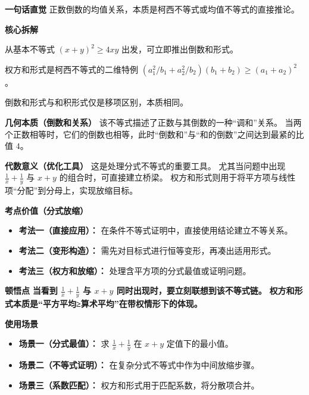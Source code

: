\begin{explanationbox}
\textbf{\textcolor{CExplanation}{一句话直觉}}
正数倒数的均值关系，本质是柯西不等式或均值不等式的直接推论。

\medskip
\textbf{\textcolor{CExplanation}{核心拆解}}
\begin{description}[style=nextline, leftmargin=2.8em, labelsep=0.5em, itemsep=0.45em]
    \item[\textbf{要点一（均值变形）：}] 从基本不等式 $(x+y)^2 \ge 4xy$ 出发，可立即推出倒数和形式。
    \item[\textbf{要点二（柯西特例）：}] 权方和形式是柯西不等式的二维特例 $(a_1^2/b_1 + a_2^2/b_2)(b_1+b_2) \ge (a_1+a_2)^2$。
    \item[\textbf{要点三（形式等价）：}] 倒数和形式与和积形式仅是移项区别，本质相同。
\end{description}

\medskip
\textbf{\textcolor{CExplanation}{几何本质（倒数和关系）}}
该不等式描述了正数与其倒数的一种“调和”关系。
当两个正数相等时，它们的倒数也相等，此时“倒数和”与“和的倒数”之间达到最紧的比值 $4$。

\medskip
\textbf{\textcolor{CExplanation}{代数意义（优化工具）}}
这是处理分式不等式的重要工具。
尤其当问题中出现 $\frac{1}{x}+\frac{1}{y}$ 与 $x+y$ 的组合时，可直接建立桥梁。
权方和形式则用于将平方项与线性项“分配”到分母上，实现放缩目标。

\medskip
\textbf{\textcolor{CExplanation}{考点价值（分式放缩）}}
\begin{itemize}[leftmargin=*, itemsep=0.5em, topsep=0.4em]
    \item \textbf{考法一（直接应用）：} 在条件不等式证明中，直接使用结论建立不等关系。
    \item \textbf{考法二（变形构造）：} 需先对目标式进行恒等变形，再凑出适用形式。
    \item \textbf{考法三（权方和放缩）：} 处理含平方项的分式最值或证明问题。
\end{itemize}

\medskip
\textbf{\textcolor{CExplanation}{顿悟点}}
\textbf{当看到 $\frac{1}{x}+\frac{1}{y}$ 与 $x+y$ 同时出现时，要立刻联想到该不等式链。}
\textbf{权方和形式本质是“平方平均≥算术平均”在带权情形下的体现。}

\medskip
\textbf{\textcolor{CExplanation}{使用场景}}
\begin{itemize}[leftmargin=*, itemsep=0.5em, topsep=0.4em]
    \item \textbf{场景一（分式最值）：} 求 $\frac{1}{x}+\frac{1}{y}$ 在 $x+y$ 定值下的最小值。
    \item \textbf{场景二（不等式证明）：} 在复杂分式不等式中作为中间放缩步骤。
    \item \textbf{场景三（系数匹配）：} 权方和形式用于匹配系数，将分散项合并。
\end{itemize}
\end{explanationbox}
